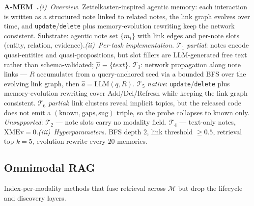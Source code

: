 \documentclass{article}
\begin{document}
\noindent\textbf{A-MEM~\citep{A-MEM}.}\quad\emph{(i)~Overview.} Zettelkasten-inspired agentic memory: each interaction is written as a structured note linked to related notes, the link graph evolves over time, and \texttt{update}/\texttt{delete} plus memory-evolution rewriting keep the network consistent. Substrate: agentic note set $\{m_i\}$ with link edges and per-note slots (entity, relation, evidence).\quad\emph{(ii)~Per-task implementation.} $\mathcal{T}_1$ \emph{partial}: notes encode quasi-entities and quasi-propositions, but slot fillers are LLM-generated free text rather than schema-validated; $\hat{\mu}\!\equiv\!\{\textit{text}\}$. $\mathcal{T}_3$: network propagation along note links --- $R$ accumulates from a query-anchored seed via a bounded BFS over the evolving link graph, then $\hat{a}\!=\!\mathrm{LLM}(q,R)$. $\mathcal{T}_5$ \emph{native}: \texttt{update}/\texttt{delete} plus memory-evolution rewriting cover Add/Del/Refresh while keeping the link graph consistent. $\mathcal{T}_6$ \emph{partial}: link clusters reveal implicit topics, but the released code does not emit a $(\mathrm{known},\mathrm{gaps},\mathrm{sug})$ triple, so the probe collapses to $\mathrm{known}$ only. \emph{Unsupported}: $\mathcal{T}_2$ — note slots carry no modality field. $\mathcal{T}_4$ — text-only notes, $\mathrm{XMEv}\!=\!0$.\quad\emph{(iii)~Hyperparameters.} BFS depth $2$, link threshold $\geq\!0.5$, retrieval top-$k\!=\!5$, evolution rewrite every $20$ memories.

\subsection{Omnimodal RAG}\label{app:b-omni}

Index-per-modality methods that fuse retrieval across $\mathcal{M}$ but drop the lifecycle and discovery layers.
\end{document}
